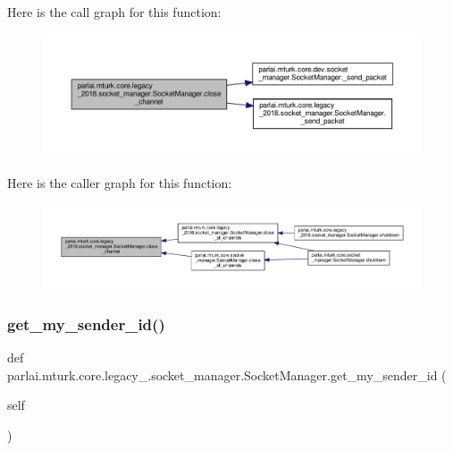 Here is the call graph for this function\+:
\nopagebreak
\begin{figure}[H]
\begin{center}
\leavevmode
\includegraphics[width=350pt]{classparlai_1_1mturk_1_1core_1_1legacy__2018_1_1socket__manager_1_1SocketManager_aba8ba15b13ecbf57b9bc9ef15d9ba620_cgraph}
\end{center}
\end{figure}
Here is the caller graph for this function\+:
\nopagebreak
\begin{figure}[H]
\begin{center}
\leavevmode
\includegraphics[width=350pt]{classparlai_1_1mturk_1_1core_1_1legacy__2018_1_1socket__manager_1_1SocketManager_aba8ba15b13ecbf57b9bc9ef15d9ba620_icgraph}
\end{center}
\end{figure}
\mbox{\label{classparlai_1_1mturk_1_1core_1_1legacy__2018_1_1socket__manager_1_1SocketManager_a8fd31d452501b480aad260eebaf51c8e}} 
\subsubsection{\texorpdfstring{get\+\_\+my\+\_\+sender\+\_\+id()}{get\_my\_sender\_id()}}
{\footnotesize\ttfamily def parlai.\+mturk.\+core.\+legacy\+\_.\+socket\+\_\+manager.\+Socket\+Manager.\+get\+\_\+my\+\_\+sender\+\_\+id (\begin{DoxyParamCaption}\item[{}]{self }\end{DoxyParamCaption})}

